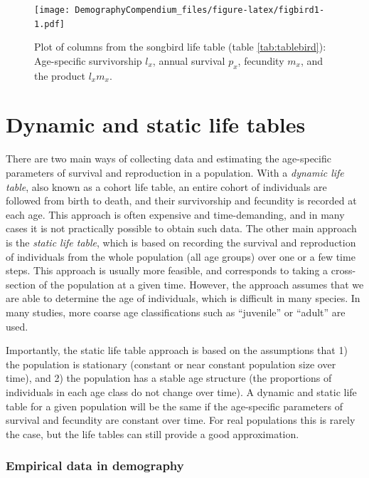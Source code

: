 \documentclass[
]{book}
\begin{document}
\begin{figure}
\centering
\texttt{[image: DemographyCompendium\_files/figure-latex/figbird1-1.pdf]}
\caption{\label{fig:figbird1}Plot of columns from the songbird life table (table \ref{tab:tablebird}): Age-specific survivorship \(l_x\), annual survival \(p_x\), fecundity \(m_x\), and the product \(l_xm_x\).}
\end{figure}

\hypertarget{dynamic-and-static-life-tables}{%
\section{Dynamic and static life tables}\label{dynamic-and-static-life-tables}}

There are two main ways of collecting data and estimating the age-specific parameters of survival and reproduction in a population. With a \emph{dynamic life table}, also known as a cohort life table, an entire cohort of individuals are followed from birth to death, and their survivorship and fecundity is recorded at each age. This approach is often expensive and time-demanding, and in many cases it is not practically possible to obtain such data. The other main approach is the \emph{static life table}, which is based on recording the survival and reproduction of individuals from the whole population (all age groups) over one or a few time steps. This approach is usually more feasible, and corresponds to taking a cross-section of the population at a given time. However, the approach assumes that we are able to determine the age of individuals, which is difficult in many species. In many studies, more coarse age classifications such as ``juvenile'' or ``adult'' are used.

Importantly, the static life table approach is based on the assumptions that 1) the population is stationary (constant or near constant population size over time), and 2) the population has a stable age structure (the proportions of individuals in each age class do not change over time). A dynamic and static life table for a given population will be the same if the age-specific parameters of survival and fecundity are constant over time. For real populations this is rarely the case, but the life tables can still provide a good approximation.

\hypertarget{empirical-data-in-demography}{%
\subsubsection*{Empirical data in demography}\label{empirical-data-in-demography}}
\end{document}
